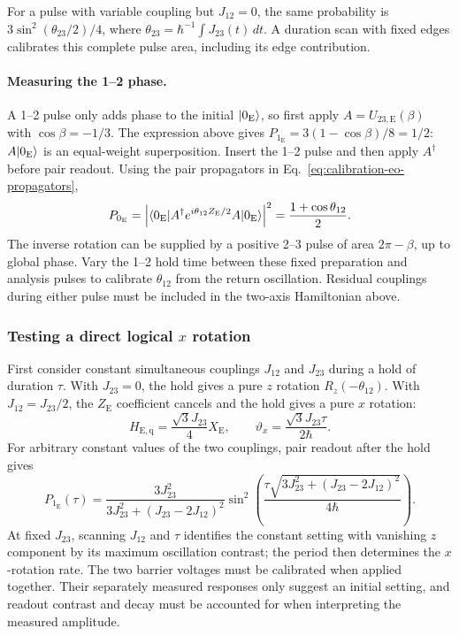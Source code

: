 For a pulse with variable coupling but $J_{12}=0$, the same
probability is $3\sin^2(\theta_{23}/2)/4$, where
$\theta_{23}=\hbar^{-1}\int J_{23}(t)\,dt$.
A duration scan with fixed edges calibrates this complete pulse
area, including its edge contribution.

\paragraph{Measuring the 1--2 phase.}
A 1--2 pulse only adds phase to the initial
$\lvert 0_{\mathrm E}\rangle$, so first apply
$A=U_{23,\mathrm E}(\beta)$ with $\cos\beta=-1/3$.
The expression above gives
$P_{1_{\mathrm E}}=3(1-\cos\beta)/8=1/2$:
$A\lvert 0_{\mathrm E}\rangle$ is an equal-weight superposition.
Insert the 1--2 pulse and then apply $A^\dagger$ before pair readout.
Using the pair propagators in
Eq.~\eqref{eq:calibration-eo-propagators},
\begin{equation}
 P_{0_{\mathrm E}}=
 \left|\bra{0_{\mathrm E}}A^\dagger
       e^{i\theta_{12}Z_{\mathrm E}/2}A
       \ket{0_{\mathrm E}}\right|^2
 =\frac{1+\cos\theta_{12}}2.
 \label{eq:calibration-eo-phase-sequence}
\end{equation}
The inverse rotation can be supplied by a positive 2--3 pulse of
area $2\pi-\beta$, up to global phase. Vary the 1--2 hold time
between these fixed preparation and analysis pulses to calibrate
$\theta_{12}$ from the return oscillation.
Residual couplings during either pulse must be included in the
two-axis Hamiltonian above.

\subsubsection{Testing a direct logical \texorpdfstring{$x$}{x} rotation}
\label{sec:calibration-eo-direct-x}

First consider constant simultaneous couplings $J_{12}$ and
$J_{23}$ during a hold of duration $\tau$. With $J_{23}=0$,
the hold gives a pure $z$ rotation $R_z(-\theta_{12})$.
With $J_{12}=J_{23}/2$, the $Z_{\mathrm E}$ coefficient
cancels and the hold gives a pure $x$ rotation:
\begin{equation}
 H_{\mathrm{E,q}}=\frac{\sqrt3J_{23}}4X_{\mathrm E},\qquad
 \vartheta_x=\frac{\sqrt3J_{23}\tau}{2\hbar}.
 \label{eq:calibration-eo-pure-x}
\end{equation}
For arbitrary constant values of the two couplings, pair readout
after the hold gives
\begin{equation}
 P_{1_{\mathrm E}}(\tau)=
 \frac{3J_{23}^2}{3J_{23}^2+(J_{23}-2J_{12})^2}
 \sin^2\left(
  \frac{\tau\sqrt{3J_{23}^2+(J_{23}-2J_{12})^2}}{4\hbar}
       \right).
 \label{eq:calibration-eo-axis-tuning}
\end{equation}
At fixed $J_{23}$, scanning $J_{12}$ and $\tau$ identifies the
constant setting with vanishing $z$ component by its maximum
oscillation contrast; the period then determines the $x$-rotation
rate. The two barrier voltages must be calibrated when applied
together. Their separately measured responses only suggest an
initial setting, and readout contrast and decay must be accounted
for when interpreting the measured amplitude.

